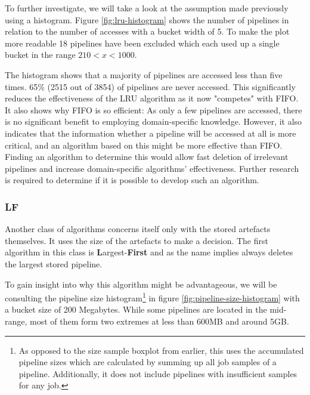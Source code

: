         To further investigate, we will take a look at the assumption made previously using a histogram. Figure \ref{fig:lru-histogram} shows the number of pipelines in relation to the number of accesses with a bucket width of 5. To make the plot more readable 18 pipelines have been excluded which each used up a single bucket in the range $210 < x < 1000$.
        
        
        
        The histogram shows that a majority of pipelines are accessed less than five times. 65\% (2515 out of 3854) of pipelines are never accessed. This significantly reduces the effectiveness of the LRU algorithm as it now "competes" with FIFO. It also shows why FIFO is so efficient: As only a few pipelines are accessed, there is no significant benefit to employing domain-specific knowledge. However, it also indicates that the information whether a pipeline will be accessed at all is more critical, and an algorithm based on this might be more effective than FIFO. \label{sec:lru-relevancy-algorithm}Finding an algorithm to determine this would allow fast deletion of irrelevant pipelines and increase domain-specific algorithms' effectiveness. Further research is required to determine if it is possible to develop such an algorithm.
        
    \subsubsection{LF}
        Another class of algorithms concerns itself only with the stored artefacts themselves. It uses the size of the artefacts to make a decision. The first algorithm in this class is \textbf{L}argest-\textbf{First} and as the name implies always deletes the largest stored pipeline.
        
        
        To gain insight into why this algorithm might be advantageous, we will be consulting the pipeline size histogram\footnote{As opposed to the size sample boxplot from earlier, this uses the accumulated pipeline sizes which are calculated by summing up all job samples of a pipeline. Additionally, it does not include pipelines with insufficient samples for any job.} in figure \ref{fig:pipeline-size-histogram} with a bucket size of 200 Megabytes. While some pipelines are located in the mid-range, most of them form two extremes at less than 600MB and around 5GB.
        
